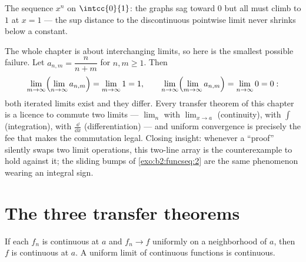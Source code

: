 \begin{omfigure}

{\small The sequence $x^n$ on $\intcc{0}{1}$: the graphs sag toward
$0$ but all must climb to $1$ at $x = 1$ --- the sup distance to the
discontinuous pointwise limit never shrinks below a constant.}
\end{omfigure}

\begin{example}\label{ex:b2:funcseq:doublelimit}
The whole chapter is about interchanging limits, so here is the
smallest possible failure. Let $a_{n,m} = \dfrac{n}{n+m}$ for
$n, m \geq 1$. Then
\[
\lim_{m\to\infty}\Bigl(\lim_{n\to\infty}a_{n,m}\Bigr)
= \lim_{m\to\infty} 1 = 1,
\qquad
\lim_{n\to\infty}\Bigl(\lim_{m\to\infty}a_{n,m}\Bigr)
= \lim_{n\to\infty} 0 = 0 :
\]
both iterated limits exist and they differ. Every transfer
theorem of this chapter is a licence to commute two limits ---
$\lim_n$ with $\lim_{x\to a}$ (continuity), with $\int$
(integration), with $\frac{\dd}{\dd x}$ (differentiation) ---
and uniform convergence is precisely the fee that makes the
commutation legal. Closing insight: whenever a ``proof''
silently swaps two limit operations, this two-line array is
the counterexample to hold against it; the sliding bumps of
\cref{exo:b2:funcseq:2} are the same phenomenon wearing an
integral sign.
\end{example}

\section{The three transfer theorems}

\begin{theorem}[Continuity]\label{thm:b2:funcseq:continuity}
If each $f_n$ is continuous at $a$ and $f_n \to f$ uniformly on a
neighborhood of $a$, then $f$ is continuous at $a$. A uniform limit
of continuous functions is continuous.
\end{theorem}

